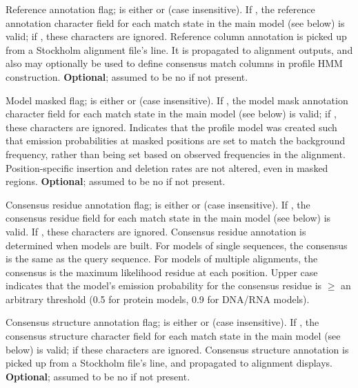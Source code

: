 \begin{sreitems}{}
\item [\monob{RF <s>}] Reference annotation flag;  is
either  or  (case insensitive). If , the
reference annotation character field for each match state in the main
model (see below) is valid; if , these characters are
ignored.  Reference column annotation is picked up from a Stockholm
alignment file's  line. It is propagated to alignment
outputs, and also may optionally be used to define consensus match
columns in profile HMM construction. \textbf{Optional}; assumed to be
no if not present.

\item [\monob{MM <s>}] Model masked flag;  is
either  or  (case insensitive). If , the
model mask annotation character field for each match state in the main
model (see below) is valid; if , these characters are
ignored. Indicates that the profile model was created such that
emission probabilities at masked positions are set to match the 
background frequency, rather than being set based on observed frequencies 
in the alignment. Position-specific insertion and deletion rates are not 
altered, even in masked regions. \textbf{Optional}; assumed to be
no if not present.

\item [\monob{CONS <s>}] Consensus residue annotation flag;
   is either  or  (case insensitive).  If
  , the consensus residue field for each match state in the
  main model (see below) is valid. If , these characters are
  ignored. Consensus residue annotation is determined when models are
  built. For models of single sequences, the consensus is the same as
  the query sequence. For models of multiple alignments, the consensus
  is the maximum likelihood residue at each position. Upper case
  indicates that the model's emission probability for the consensus
  residue is $\geq$ an arbitrary threshold (0.5 for protein models,
  0.9 for DNA/RNA models).

\item [\monob{CS <s>}] Consensus structure annotation flag;
 is either  or  (case insensitive). If
, the consensus structure character field for each match
state in the main model (see below) is valid; if  these
characters are ignored. Consensus structure annotation is picked up
from a Stockholm file's  line, and propagated to
alignment displays.  \textbf{Optional}; assumed to be no if not
present.


\end{sreitems}
